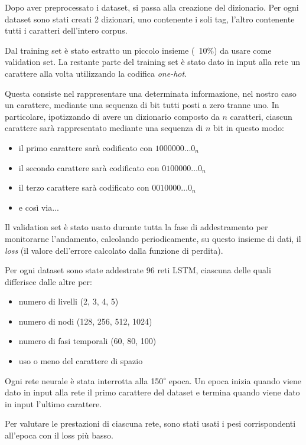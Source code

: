 Dopo aver preprocessato i dataset, si passa alla creazione del dizionario.
Per ogni dataset sono stati creati 2 dizionari, uno contenente i soli tag, l'altro contenente tutti i caratteri dell'intero corpus.

Dal training set \`e stato estratto un piccolo insieme (~10\%) da usare come validation set.
La restante parte del training set \`e stato dato in input alla rete un carattere alla volta utilizzando la codifica \emph{one-hot}.

Questa consiste nel rappresentare una determinata informazione, nel nostro caso un carattere, mediante una sequenza di bit tutti posti a zero tranne uno.
In particolare, ipotizzando di avere un dizionario composto da $n$ caratteri, ciascun carattere sar\`a rappresentato mediante una sequenza di $n$ bit in questo modo:

\begin{itemize}
  \item il primo carattere sar\`a codificato con $1000000\dots0_{n}$
  \item il secondo carattere sar\`a codificato con $0100000\dots0_{n}$
  \item il terzo carattere sar\`a codificato con $0010000\dots0_{n}$
  \item e cos\`i via...
\end{itemize}

Il validation set \`e stato usato durante tutta la fase di addestramento per monitorarne l'andamento, calcolando periodicamente, su questo insieme di dati, il \emph{loss} (il valore dell'errore calcolato dalla funzione di perdita).

Per ogni dataset sono state addestrate 96 reti LSTM, ciascuna delle quali differisce dalle altre per:

\begin{itemize}
  \item numero di livelli (2, 3, 4, 5)
  \item numero di nodi (128, 256, 512, 1024)
  \item numero di fasi temporali (60, 80, 100)
  \item uso o meno del carattere di spazio
\end{itemize}

Ogni rete neurale \`e stata interrotta alla 150\textsuperscript{$\circ$} epoca.
Un epoca inizia quando viene dato in input alla rete il primo carattere del dataset e termina quando viene dato in input l'ultimo carattere.

Per valutare le prestazioni di ciascuna rete, sono stati usati i pesi corrispondenti all'epoca con il loss pi\`u basso.
